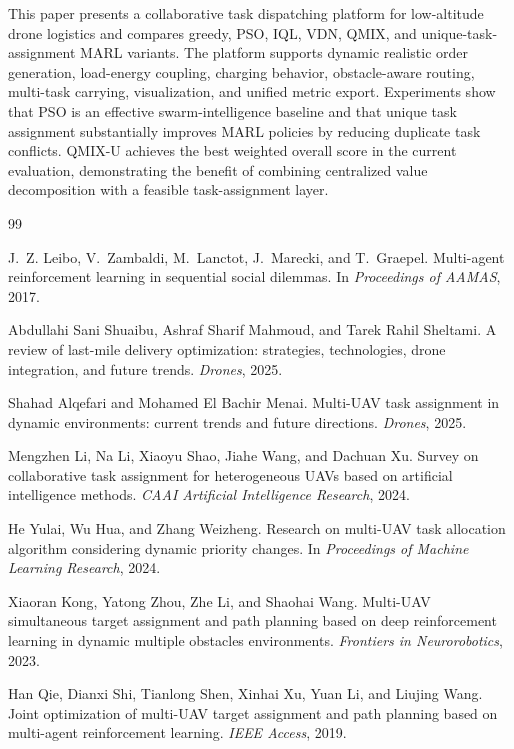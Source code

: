 \documentclass[sigconf,balance=false]{aamas}
\begin{document}
This paper presents a collaborative task dispatching platform for low-altitude drone logistics and compares greedy, PSO, IQL, VDN, QMIX, and unique-task-assignment MARL variants. The platform supports dynamic realistic order generation, load-energy coupling, charging behavior, obstacle-aware routing, multi-task carrying, visualization, and unified metric export. Experiments show that PSO is an effective swarm-intelligence baseline and that unique task assignment substantially improves MARL policies by reducing duplicate task conflicts. QMIX-U achieves the best weighted overall score in the current evaluation, demonstrating the benefit of combining centralized value decomposition with a feasible task-assignment layer.

\begin{thebibliography}{99}

J.~Z. Leibo, V.~Zambaldi, M.~Lanctot, J.~Marecki, and T.~Graepel.
Multi-agent reinforcement learning in sequential social dilemmas.
In \emph{Proceedings of AAMAS}, 2017.

Abdullahi Sani Shuaibu, Ashraf Sharif Mahmoud, and Tarek Rahil Sheltami.
A review of last-mile delivery optimization: strategies, technologies, drone integration, and future trends.
\emph{Drones}, 2025.

Shahad Alqefari and Mohamed El Bachir Menai.
Multi-UAV task assignment in dynamic environments: current trends and future directions.
\emph{Drones}, 2025.

Mengzhen Li, Na Li, Xiaoyu Shao, Jiahe Wang, and Dachuan Xu.
Survey on collaborative task assignment for heterogeneous UAVs based on artificial intelligence methods.
\emph{CAAI Artificial Intelligence Research}, 2024.

He Yulai, Wu Hua, and Zhang Weizheng.
Research on multi-UAV task allocation algorithm considering dynamic priority changes.
In \emph{Proceedings of Machine Learning Research}, 2024.

Xiaoran Kong, Yatong Zhou, Zhe Li, and Shaohai Wang.
Multi-UAV simultaneous target assignment and path planning based on deep reinforcement learning in dynamic multiple obstacles environments.
\emph{Frontiers in Neurorobotics}, 2023.

Han Qie, Dianxi Shi, Tianlong Shen, Xinhai Xu, Yuan Li, and Liujing Wang.
Joint optimization of multi-UAV target assignment and path planning based on multi-agent reinforcement learning.
\emph{IEEE Access}, 2019.


\end{thebibliography}
\end{document}
